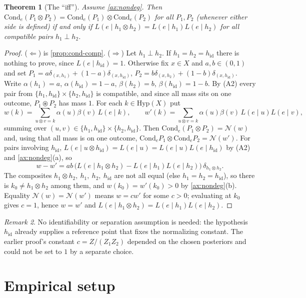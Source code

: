 \documentclass[11pt]{article}
\newtheorem{theorem}{Theorem}[section]
\theoremstyle{definition}
\theoremstyle{remark}
\newtheorem{remark}[theorem]{Remark}
\newcommand{\Hyp}{\mathrm{Hyp}}
\newcommand{\Cond}{\mathrm{Cond}}
\newcommand{\hid}{h_{\mathrm{id}}}
\newcommand{\N}{\mathcal{N}}
\newcommand{\cp}{\circledast}
\begin{document}
\begin{theorem}[The ``iff'']\label{thm:iff}
Assume \cref{ax:nondeg}. Then $\Cond_e(P_1\otimes P_2)=\Cond_e(P_1)\otimes\Cond_e(P_2)$ for all
$P_1,P_2$ (whenever either side is defined) if and only if
$L(e\mid h_1\otimes h_2)=L(e\mid h_1)L(e\mid h_2)$ for all compatible pairs $h_1\perp h_2$.
\end{theorem}
\begin{proof}
($\Leftarrow$) is \cref{prop:cond-comp}. ($\Rightarrow$) Let $h_1\perp h_2$. If $h_1=h_2=\hid$ there
is nothing to prove, since $L(e\mid\hid)=1$. Otherwise fix $x\in X$ and $a,b\in(0,1)$ and set
$P_1=a\delta_{(x,h_1)}+(1-a)\delta_{(x,\hid)}$, $P_2=b\delta_{(x,h_2)}+(1-b)\delta_{(x,\hid)}$. Write
$\alpha(h_1)=a$, $\alpha(\hid)=1-a$, $\beta(h_2)=b$, $\beta(\hid)=1-b$. By (A2) every pair from
$\{h_1,\hid\}\times\{h_2,\hid\}$ is compatible, and since all mass sits on one outcome, $P_1\cp P_2$
has mass $1$. For each $k\in\Hyp(X)$ put
\[
w(k)=\sum_{u\otimes v=k}\alpha(u)\beta(v)\,L(e\mid k),\qquad
w'(k)=\sum_{u\otimes v=k}\alpha(u)\beta(v)\,L(e\mid u)L(e\mid v),
\]
summing over $(u,v)\in\{h_1,\hid\}\times\{h_2,\hid\}$. Then $\Cond_e(P_1\otimes P_2)=\N(w)$ and, using
that all mass is on one outcome, $\Cond_eP_1\otimes\Cond_eP_2=\N(w')$. For pairs involving $\hid$,
$L(e\mid u\otimes\hid)=L(e\mid u)=L(e\mid u)L(e\mid\hid)$ by (A2) and \cref{ax:nondeg}(a), so
\[
w-w'=ab\,\big(L(e\mid h_1\otimes h_2)-L(e\mid h_1)L(e\mid h_2)\big)\,\delta_{h_1\otimes h_2}.
\]
The composites $h_1\otimes h_2,\ h_1,\ h_2,\ \hid$ are not all equal (else $h_1=h_2=\hid$), so there is
$k_0\neq h_1\otimes h_2$ among them, and $w(k_0)=w'(k_0)>0$ by \cref{ax:nondeg}(b). Equality
$\N(w)=\N(w')$ means $w=cw'$ for some $c>0$; evaluating at $k_0$ gives $c=1$, hence $w=w'$ and
$L(e\mid h_1\otimes h_2)=L(e\mid h_1)L(e\mid h_2)$.
\end{proof}

\begin{remark}
No identifiability or separation assumption is needed: the hypothesis $\hid$ already supplies a
reference point that fixes the normalizing constant. The earlier proof's constant
$c=Z/(Z_1Z_2)$ depended on the chosen posteriors and could not be set to $1$ by a separate choice.
\end{remark}

\section{Empirical setup}
\end{document}
